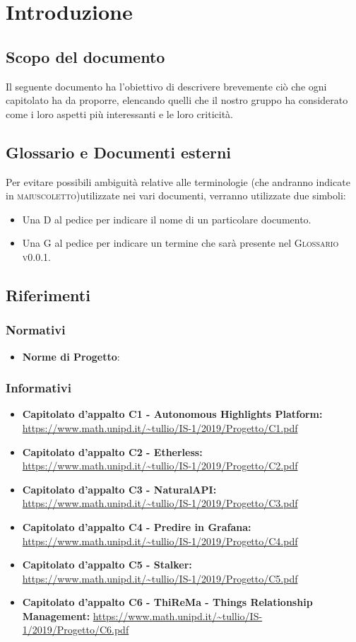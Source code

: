 
\section{Introduzione}
\subsection{Scopo del documento}
  Il seguente documento ha l'obiettivo di descrivere brevemente ciò che ogni capitolato ha da proporre, elencando quelli che il nostro gruppo ha considerato come i loro aspetti più interessanti e le loro criticità. 
\subsection{Glossario e Documenti esterni}
    Per evitare possibili ambiguità relative alle terminologie (che andranno indicate in \textsc{maiuscoletto})utilizzate nei vari documenti, verranno utilizzate due simboli:
    \begin{itemize}
      \item Una \textsc{D} al pedice per indicare il nome di un particolare documento.
      \item Una \textsc{G} al pedice per indicare un termine che sarà presente nel \textsc{Glossario v0.0.1}.
    \end{itemize}   
\subsection{Riferimenti}
    \subsubsection{Normativi}
    \begin{itemize}
      \item \textbf{Norme di Progetto}: 
    \end{itemize}
    \subsubsection{Informativi}
    \begin{itemize}
      \item \textbf{Capitolato d'appalto C1 - Autonomous Highlights Platform:} \url{https://www.math.unipd.it/~tullio/IS-1/2019/Progetto/C1.pdf}
      \item \textbf{Capitolato d'appalto C2 - Etherless:} \url{https://www.math.unipd.it/~tullio/IS-1/2019/Progetto/C2.pdf}
      \item \textbf{Capitolato d'appalto C3 - NaturalAPI:} \url{https://www.math.unipd.it/~tullio/IS-1/2019/Progetto/C3.pdf}
      \item \textbf{Capitolato d'appalto C4 - Predire in Grafana:} \url{https://www.math.unipd.it/~tullio/IS-1/2019/Progetto/C4.pdf}
      \item \textbf{Capitolato d'appalto C5 - Stalker:} \url{https://www.math.unipd.it/~tullio/IS-1/2019/Progetto/C5.pdf}
      \item \textbf{Capitolato d'appalto C6 - ThiReMa - Things Relationship Management:} \url{https://www.math.unipd.it/~tullio/IS-1/2019/Progetto/C6.pdf}
    \end{itemize}
    
  

